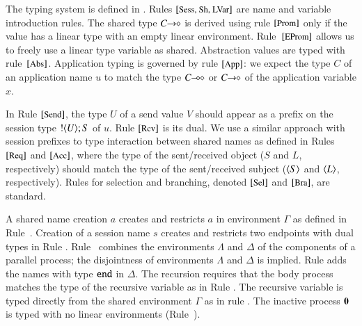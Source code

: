 
The typing system is defined in .
Rules ${\footnotesize[\textrm{\small Sess, Sh, LVar}]}$ are name and variable introduction rules. 
The shared type $C\!\! \rightarrow\!\! \diamond$ %
is derived using rule ${\footnotesize[\textrm{\small Prom}]}$ only  
if the value has a linear type with an empty linear
environment.
Rule~${\footnotesize[\textrm{\small EProm}]}$ allows us to freely use a linear
type variable as shared.
%
Abstraction values are typed with rule~${\footnotesize[\textrm{\small Abs}]}$.
Application typing
is governed by rule ${\footnotesize[\textrm{\small App}]}$: we expect
the type $C$ of an application name $u$ 
to match the type $C\!\! \multimap\!\! \diamond$ or $C\!\! \rightarrow\!\! \diamond$
of the application variable $x$.
%

In Rule ${\footnotesize[\textrm{\small Send}]}$, 
the type $U$ of a send value $V$ should appear as a prefix
on the session type $! \langle U \rangle ; S$ of $u$.
Rule ${\footnotesize[\textrm{\small Rcv}]}$ is its dual.  
We use a similar approach with session prefixes
to type interaction between shared names as defined 
in Rules ${\footnotesize[\textrm{\small Req}]}$ and ${\footnotesize[\textrm{\small Acc}]}$,
where the type of the sent/received object 
($S$ and $L$, respectively) should
match the type of the sent/received subject
($\langle S \rangle$ and $\langle L \rangle$, respectively).
Rules for selection and branching, denoted
${\footnotesize[\textrm{\small Sel}]}$ and ${\footnotesize[\textrm{\small Bra}]}$, are standard. 
%

A
shared name creation $a$ creates and restricts
$a$ in environment $\Gamma$ as defined in 
Rule~. 
Creation of a session name $s$
creates and restricts two endpoints with dual types 
in Rule . 
Rule~ 
combines the environments
$\Lambda$ and $\Delta$ of
the components of a parallel process;
the disjointness of environments $\Lambda$ and $\Delta$
is implied. Rule  adds 
the names with type $\mathtt{end}$ in $\Delta$.  
The recursion requires that the body process 
matches the type of the recursive
variable as in Rule .
The recursive variable is typed
directly from the shared environment $\Gamma$ as
in rule .
The inactive process $\mathbf{0}$ is typed with no
linear environments (Rule~). 


